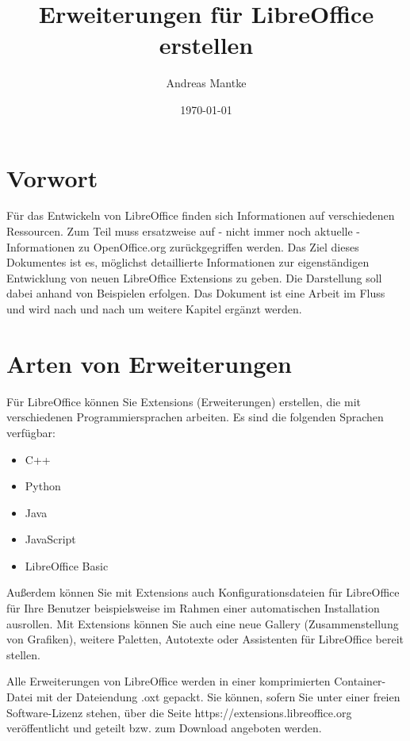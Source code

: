 \documentclass[a4paper,10pt,pagesize,titlepage]{scrbook}
\author{Andreas Mantke}
\title{Erweiterungen für LibreOffice erstellen}
\date{\today}
\begin{document}
 

\maketitle
 \setcounter{tocdepth}{10}

\tableofcontents

\chapter*{Vorwort}

Für das Entwickeln von LibreOffice finden sich Informationen auf verschiedenen Ressourcen. Zum Teil muss ersatzweise auf - nicht immer noch aktuelle - Informationen zu OpenOffice.org zurückgegriffen werden. Das Ziel dieses Dokumentes ist es, möglichst detaillierte Informationen zur eigenständigen Entwicklung von neuen LibreOffice Extensions zu geben. Die Darstellung soll dabei anhand von Beispielen erfolgen. Das Dokument ist eine Arbeit im Fluss und wird nach und nach um weitere Kapitel ergänzt werden.

\chapter{Arten von Erweiterungen}
Für LibreOffice können Sie Extensions (Erweiterungen) erstellen, die mit verschiedenen Programmiersprachen arbeiten. Es sind die folgenden Sprachen verfügbar:
\begin{itemize}
	\item C++
	\item Python
	\item Java
	\item JavaScript
	\item LibreOffice Basic
\end{itemize}
Außerdem können Sie mit Extensions auch Konfigurationsdateien für LibreOffice für Ihre Benutzer beispielsweise im Rahmen einer automatischen Installation ausrollen. Mit Extensions können Sie auch eine neue Gallery (Zusammenstellung von Grafiken), weitere Paletten, Autotexte oder Assistenten für LibreOffice bereit stellen.

Alle Erweiterungen von LibreOffice werden in einer komprimierten Container-Datei mit der Dateiendung .oxt gepackt. Sie können, sofern Sie unter einer freien Software-Lizenz stehen, über die Seite https://extensions.libreoffice.org veröffentlicht und geteilt bzw. zum Download angeboten werden.
\end{document}
